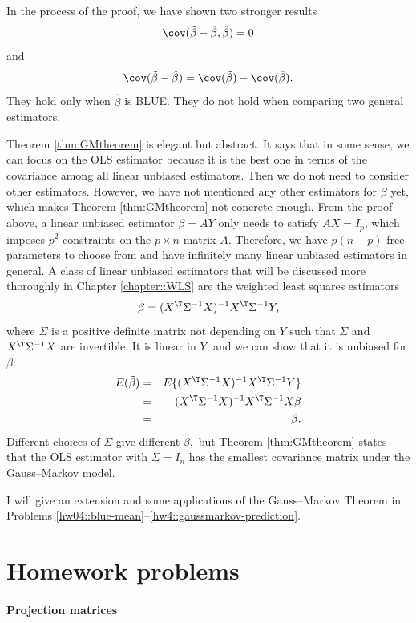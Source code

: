 In the process of the proof, we have shown two stronger results
$$
\cov(\tilde{\beta} - \hat{\beta}, \hat{\beta}) = 0
$$
and
$$
\cov(\tilde{\beta} - \hat{\beta})  =  \cov(\tilde{\beta})-\cov(\hat{\beta}).
$$
They hold only when $\hat{\beta}$ is BLUE. They do not hold when comparing two general estimators. 




Theorem \ref{thm:GMtheorem} is elegant but abstract. It says that
in some sense, we can focus on the OLS estimator because it is
the best one in terms of the covariance among all linear unbiased estimators. Then
we do not need to consider other estimators. However, we have not
mentioned any other estimators for $\beta$ yet, which makes Theorem
\ref{thm:GMtheorem} not concrete enough. From the proof above, a
linear unbiased estimator $\tilde{\beta}=AY$ only needs to satisfy
$AX=I_{p}$, which imposes $p^{2}$ constraints on the $p\times n$
matrix $A$. Therefore, we have $p(n-p)$ free parameters to choose
from and have infinitely many linear unbiased estimators in general. A
class of linear unbiased estimators that will be discussed more thoroughly in Chapter \ref{chapter::WLS} are the weighted least squares estimators
\[
\tilde{\beta}=(X^{\T}\Sigma^{-1}X)^{-1}X^{\T}\Sigma^{-1}Y,
\]
 where $\Sigma$ is a positive definite matrix not depending on $Y$
such that $\Sigma$ and $X^{\T}\Sigma^{-1}X$ are invertible. It is linear in $Y$, and we
can show that it is unbiased for $\beta$:
\begin{eqnarray*}
E(\tilde{\beta}) 
&=& E\{ (X^{\T}\Sigma^{-1}X)^{-1}X^{\T}\Sigma^{-1}Y\} \\
&=& (X^{\T}\Sigma^{-1}X)^{-1}X^{\T}\Sigma^{-1}X\beta \\
&=&\beta.
\end{eqnarray*}
Different choices of $\Sigma$ give different $\tilde{\beta},$ but
Theorem \ref{thm:GMtheorem} states that the OLS estimator with $\Sigma=I_{n}$
has the smallest covariance matrix under the Gauss--Markov model. 

I will give an extension and some applications of the Gauss--Markov Theorem in Problems \ref{hw04::blue-mean}--\ref{hw4::gaussmarkov-prediction}. 



 

\section{Homework problems}

\paragraph{Projection matrices}\label{hw::gauss-markov-projectionm}

